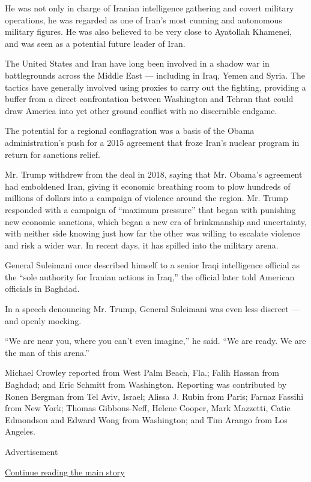 He was not only in charge of Iranian intelligence gathering and covert
military operations, he was regarded as one of Iran's most cunning and
autonomous military figures. He was also believed to be very close to
Ayatollah Khamenei, and was seen as a potential future leader of Iran.

The United States and Iran have long been involved in a shadow war in
battlegrounds across the Middle East --- including in Iraq, Yemen and
Syria. The tactics have generally involved using proxies to carry out
the fighting, providing a buffer from a direct confrontation between
Washington and Tehran that could draw America into yet other ground
conflict with no discernible endgame.

The potential for a regional conflagration was a basis of the Obama
administration's push for a 2015 agreement that froze Iran's nuclear
program in return for sanctions relief.

Mr. Trump withdrew from the deal in 2018, saying that Mr. Obama's
agreement had emboldened Iran, giving it economic breathing room to plow
hundreds of millions of dollars into a campaign of violence around the
region. Mr. Trump responded with a campaign of ``maximum pressure'' that
began with punishing new economic sanctions, which began a new era of
brinkmanship and uncertainty, with neither side knowing just how far the
other was willing to escalate violence and risk a wider war. In recent
days, it has spilled into the military arena.

General Suleimani once described himself to a senior Iraqi intelligence
official as the ``sole authority for Iranian actions in Iraq,'' the
official later told American officials in Baghdad.

In a speech denouncing Mr. Trump, General Suleimani was even less
discreet --- and openly mocking.

``We are near you, where you can't even imagine,'' he said. ``We are
ready. We are the man of this arena.''

Michael Crowley reported from West Palm Beach, Fla.; Falih Hassan from
Baghdad; and Eric Schmitt from Washington. Reporting was contributed by
Ronen Bergman from Tel Aviv, Israel; Alissa J. Rubin from Paris; Farnaz
Fassihi from New York; Thomas Gibbons-Neff, Helene Cooper, Mark
Mazzetti, Catie Edmondson and Edward Wong from Washington; and Tim
Arango from Los Angeles.

Advertisement

\protect\hyperlink{after-bottom}{Continue reading the main story}


